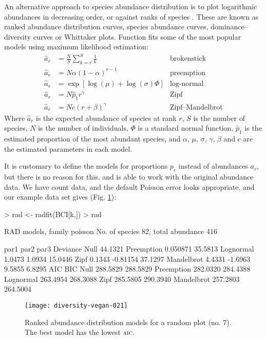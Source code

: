 \documentclass[a4paper,10pt,twocolumn]{article}
\begin{document}
An alternative approach to species abundance distribution is to plot
logarithmic abundances in decreasing order, or against ranks of
species \citep{Whittaker65}.  These are known as ranked abundance
distribution curves, species abundance curves, dominance--diversity
curves or Whittaker plots.  Function  fits some of the
most popular models \citep{Bastow91} using maximum likelihood
estimation:
\begin{align}
\hat a_r &= \frac{N}{S} \sum_{k=r}^S \frac{1}{k} &\text{brokenstick}\\
\hat a_r &= N \alpha (1-\alpha)^{r-1} & \text{preemption} \\
\hat a_r &= \exp \left[\log (\mu) + \log (\sigma) \Phi \right]
&\text{log-normal}\\
\hat a_r &= N \hat p_1 r^\gamma &\text{Zipf}\\
\hat a_r &= N c (r + \beta)^\gamma &\text{Zipf--Mandelbrot}
\end{align}
Where $\hat a_r$ is the expected abundance of species at rank $r$, $S$
is the number of species, $N$ is the number of individuals, $\Phi$ is
a standard normal function, $\hat p_1$ is the estimated proportion of
the most abundant species, and $\alpha$, $\mu$, $\sigma$, $\gamma$,
$\beta$ and $c$ are the estimated parameters in each model.

It is customary to define the models for proportions $p_r$ instead of
abundances $a_r$, but there is no reason for this, and 
is able to work with the original abundance data.  We have count data,
and the default Poisson error looks appropriate, and our example data
set gives (Fig. \ref{fig:rad}):
\begin{Schunk}
\begin{Sinput}
> rad <- radfit(BCI[k,])
> rad
\end{Sinput}
\begin{Soutput}
RAD models, family poisson 
No. of species 82, total abundance 416

           par1      par2     par3    Deviance
Null                                   44.1321
Preemption  0.050871                   35.5813
Lognormal   1.0473    1.0934           15.0446
Zipf        0.1343   -0.81154          37.1297
Mandelbrot  4.4331   -1.6963   9.5855   6.8295
           AIC      BIC     
Null       288.5829 288.5829
Preemption 282.0320 284.4388
Lognormal  263.4954 268.3088
Zipf       285.5805 290.3940
Mandelbrot 257.2803 264.5004
\end{Soutput}
\end{Schunk}
\begin{figure}
\texttt{[image: diversity-vegan-021]}
\caption{Ranked abundance distribution models for a random plot
  (no. 7).  The best model has the lowest \textsc{aic}.}
\label{fig:rad}
\end{figure}
\end{document}

